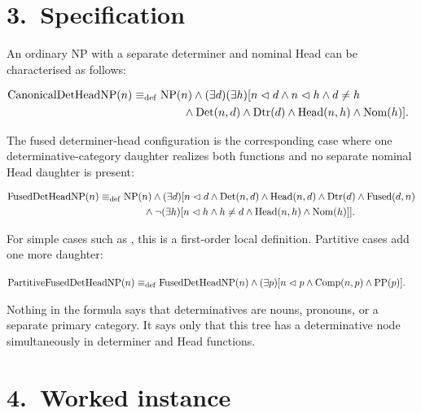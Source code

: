 \documentclass[11pt]{article}
\newcommand{\Dtr}{\Cat{Dtr}}
\newcommand{\Fused}{\mathrm{Fused}}
\newcommand{\FusedDetHeadNP}{\mathrm{FusedDetHeadNP}}
\newcommand{\CanonicalDetHeadNP}{\mathrm{CanonicalDetHeadNP}}
\begin{document}
\section*{3.~Specification}

An ordinary NP with a separate determiner and nominal Head can be characterised
as follows:

\ea
$\begin{aligned}
\CanonicalDetHeadNP(n) \defas {} & \NP(n) \wedge
  (\exists d)(\exists h)[n \imdom d \wedge n \imdom h \wedge d \neq h \\
& \qquad {} \wedge \Det(n,d) \wedge \Dtr(d) \wedge \Hd(n,h) \wedge \Nom(h)].
\end{aligned}$\\
\z

The fused determiner-head configuration is the corresponding case where one
determinative-category daughter realizes both functions and no separate
nominal Head daughter is present:

\ea
$\begin{aligned}
\FusedDetHeadNP(n) \defas {} & \NP(n) \wedge
  (\exists d)[n \imdom d \wedge \Det(n,d) \wedge \Hd(n,d)
    \wedge \Dtr(d) \wedge \Fused(d,n) \\
& \qquad {} \wedge
  \neg(\exists h)[n \imdom h \wedge h \neq d \wedge \Hd(n,h) \wedge \Nom(h)]].
\end{aligned}$\\
\z

For simple cases such as , this is a first-order local
definition. Partitive cases add one more daughter:

\ea
$\begin{aligned}
\mathrm{PartitiveFusedDetHeadNP}(n) \defas {} & \FusedDetHeadNP(n) \wedge
  (\exists p)[n \imdom p \wedge \Cmp(n,p) \wedge \PP(p)].
\end{aligned}$\\
\z

Nothing in the formula says that determinatives are nouns, pronouns, or a
separate primary category. It says only that this tree has a determinative
node simultaneously in determiner and Head functions.

\section*{4.~Worked instance}
\end{document}
